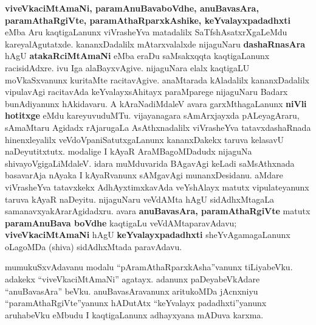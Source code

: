 \textbf{viveVkaciMtAmaNi, paramAnuBavaboVdhe, anuBavasAra, paramAthaRgiVte, paramAthaRparxkAshike, keYvalayxpadadhxti} eMba Aru kaqtigaLanunx viVrasheYva matadalilx SaTfshAsatxrXgaLeMdu kareyalAgutatxde. kananxDadalilx mAtarxvalalxde nijaguNaru \textbf{dashaRnasAra} hAgU \textbf{atakaR\-ciMtAmaNi} eMba eraDu saMsakxqqta kaqtigaLanunx racisidAdxre. ivu Iga alaBayxvAgive. nijaguNara elalx kaqtigaLU moVkaSxvanunx kuritaMte  racitavAgive. anaMtarada kAladalilx kananxDadalilx vipulavAgi racitavAda keYvalayxsAhitayx paraMparege nijaguNaru Badarx bunAdiyanunx hAkidavaru. A kAraNadiMdaleV avara garxMthagaLanunx \textbf{niVli hotitxge} eMdu kareyuvuduMTu. vijayanagara sAmArxjayxda pALeyagAraru, sAmaMtaru Agidadx rAjarugaLa AsAthxnadalilx viVrasheYva tatavxdashaRnada hinenxleyalilx veVdoVpaniSatutxgaLanunx kananxDakekx taruva kelasavU naDeyutitxtutx. modalige I kAyaR AraMBagoMDadudx nijaguNa shivayoVgigaLiMdaleV. idara muMduvarida BAga\-vAgi keLadi saMsAthxnada basavarAja nAyaka I kAyaRvanunx sAMgavAgi munanxDesidanu. aMdare viVrasheYva tatavxkekx AdhAyxtimxkavAda \hbox{veYshAlayx} matutx vipulateyanunx taruva kAyaR naDeyitu. nijaguNaru veVdAMta hAgU sidAdhxMtagaLa samanavxyakArarAgidadxru. avara \textbf{anuBavasAra, paramAthaRgiVte} matutx \textbf{paramAnuBava boVdhe} kaqtigaLu veVdAMtaparavAdavu; \textbf{viveVkaciMtAmaNi} hAgU \textbf{keYvalayx\-padadhxti} sheYvAgamagaLanunx oLagoMDa (shiva) sidAdhxMtada paravAdavu.

mumukuSxvAdavanu modalu ``pAramAthaRparxkAsha''vanunx tiLiyabeVku. adakekx ``viveVkaciMtAmaNi'' agatayx. adanunx paDeyabeVkAdare ``anuBavasAra'' beVku. anuBavasAravanunx aritukoMDa jAcnxniyu ``paramAthaRgiVte''yanunx hADutAtx ``keYvalayx padadhxti''yanunx aruhabeVku eMbudu I kaqtigaLanunx adhayxyana mADuva karxma.

